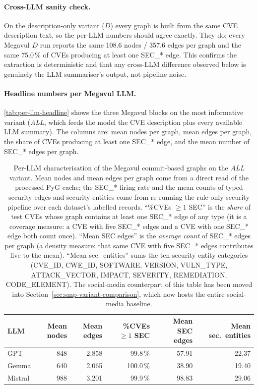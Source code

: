\documentclass[11pt,a4paper]{article}
\begin{document}
\paragraph{Cross-LLM sanity check.}
On the description-only variant ($D$) every graph is built
from the same CVE description text, so the per-LLM numbers
should agree exactly. They do: every Megavul $D$ run reports
the same 108.6 nodes / 357.6 edges per graph and the same
75.0\,\% of CVEs producing at least one SEC\_* edge. This
confirms the extraction is deterministic and that any
cross-LLM difference observed below is genuinely the LLM
summariser's output, not pipeline noise.

\paragraph{Headline numbers per Megavul LLM.}
\autoref{tab:per-llm-headline} shows the three Megavul blocks
on the most informative variant (\emph{ALL}, which feeds
the model the CVE description plus every available LLM
summary). The columns are: mean nodes per graph, mean edges
per graph, the share of CVEs producing at least one SEC\_*
edge, and the mean number of SEC\_* edges per graph.

\begin{table}[!htbp]
\centering\small
\begin{tabular}{l r r r r r}
\toprule
LLM & Mean nodes & Mean edges & \%CVEs $\geq 1$ SEC & Mean SEC edges & Mean sec.~entities \\
\midrule
GPT      & 848 & 2{,}858 & 99.8\,\% &  57.91 & 22.37 \\
Gemma    & 640 & 2{,}065 & 100.0\,\% & 38.90 & 19.40 \\
Mistral  & 988 & 3{,}201 &  99.9\,\% & 98.83 & 29.06 \\
\bottomrule
\end{tabular}
\caption{Per-LLM characterisation of the Megavul commit-based
graphs on the \emph{ALL} variant. Mean nodes and mean edges
per graph come from a direct read of the processed PyG
cache; the SEC\_* firing rate and the mean counts of typed
security edges and security entities come from re-running
the rule-only security pipeline over each dataset's labelled
records. ``\%CVEs $\geq 1$ SEC'' is the \emph{share} of
test CVEs whose graph contains at least one SEC\_* edge
of any type (it is a coverage measure: a CVE with five
SEC\_* edges and a CVE with one SEC\_* edge both count
once). ``Mean SEC edges'' is the \emph{average count} of
SEC\_* edges per graph (a density measure: that same CVE
with five SEC\_* edges contributes five to the mean).
``Mean sec.\ entities'' sums the ten security entity
categories (CVE\_ID, CWE\_ID, SOFTWARE, VERSION, VULN\_TYPE,
ATTACK\_VECTOR, IMPACT, SEVERITY, REMEDIATION,
CODE\_ELEMENT). The social-media counterpart of this table
has been moved into Section~\ref{sec:smp-variant-comparison},
which now hosts the entire social-media baseline.}
\label{tab:per-llm-headline}
\end{table}
\end{document}
